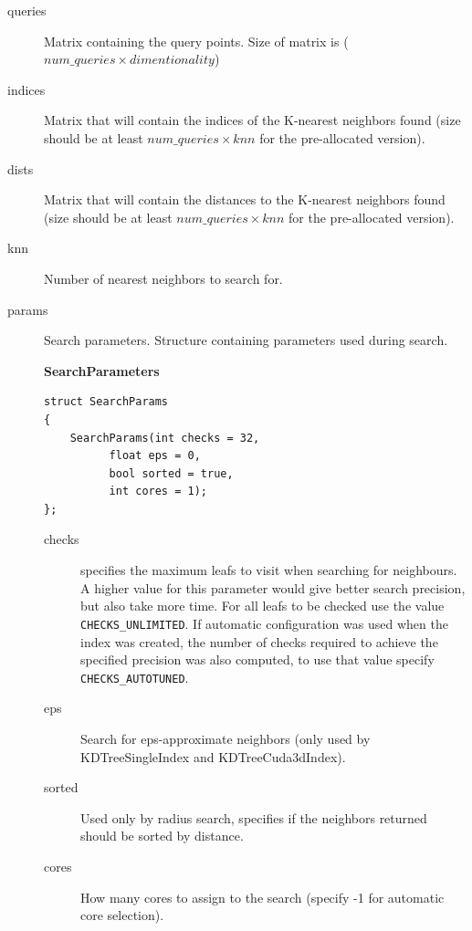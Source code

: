 \documentclass[letter,10pt]{article}
\begin{document}
\begin{description}
\item[queries]{Matrix containing the query points. Size of matrix is ($num\_queries \times dimentionality $)}
\item[indices]{Matrix that will contain the indices of the K-nearest neighbors found (size should be at least
$num\_queries \times knn$ for the pre-allocated version).}
\item[dists]{Matrix that will contain the distances to the K-nearest neighbors found (size should be at least
$num\_queries \times knn$ for the pre-allocated version).}
\item[knn]{Number of nearest neighbors to search for.}
\item[params]{Search parameters.} Structure containing parameters used during search.

\textbf{SearchParameters}
\begin{Verbatim}[fontsize=\footnotesize]
struct SearchParams
{
	SearchParams(int checks = 32,
		  float eps = 0,
		  bool sorted = true,
		  int cores = 1);
};
\end{Verbatim}
\begin{description}
 \item[checks] specifies the maximum leafs to visit when searching for neighbours. A
higher value for this parameter would give better search precision, but
also take more time. For all leafs to be checked use the value \texttt{CHECKS\_UNLIMITED}.
If automatic configuration was used when the index was created, the number of checks 
required to achieve the specified precision was also computed, to use that value specify \texttt{CHECKS\_AUTOTUNED}.
 \item[eps] Search for eps-approximate neighbors (only used by KDTreeSingleIndex and KDTreeCuda3dIndex).
 \item[sorted] Used only by radius search, specifies if the neighbors returned should be sorted by distance.
 \item[cores] How many cores to assign to the search (specify -1 for automatic core selection).
\end{description}
\end{description}
\end{document}
